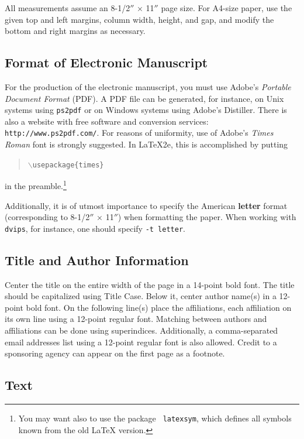 \documentclass{article}
\begin{document}
All measurements assume an 8-1/2$''$ $\times$ 11$''$ page size. For
A4-size paper, use the given top and left margins, column width,
height, and gap, and modify the bottom and right margins as necessary.

\subsection{Format of Electronic Manuscript}

For the production of the electronic manuscript, you must use Adobe's
{\em Portable Document Format} (PDF). A PDF file can be generated, for
instance, on Unix systems using {\tt ps2pdf} or on Windows systems
using Adobe's Distiller. There is also a website with free software
and conversion services: {\tt http://www.ps2pdf.com/}. For reasons of
uniformity, use of Adobe's {\em Times Roman} font is strongly suggested. In
\LaTeX2e{}, this is accomplished by putting
\begin{quote} 
\mbox{\tt $\backslash$usepackage\{times\}}
\end{quote}
in the preamble.\footnote{You may want also to use the package {\tt
latexsym}, which defines all symbols known from the old \LaTeX{}
version.}
  
Additionally, it is of utmost importance to specify the American {\bf
letter} format (corresponding to 8-1/2$''$ $\times$ 11$''$) when
formatting the paper. When working with {\tt dvips}, for instance, one
should specify {\tt -t letter}.

\subsection{Title and Author Information}

Center the title on the entire width of the page in a 14-point bold
font. The title should be capitalized using Title Case. Below it, center author name(s) in a 12-point bold font. On the following line(s) place the affiliations, each affiliation on its own line using a 12-point regular font. Matching between authors and affiliations can be done using superindices. Additionally, a comma-separated email addresses list using a 12-point regular font is also allowed. Credit to a
sponsoring agency can appear on the first page as a footnote.

\subsection{Text}
\end{document}
